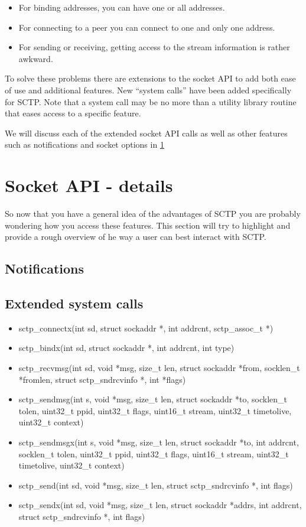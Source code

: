 \documentclass[conference]{IEEEtran}
\begin{document}
\begin{itemize}
 \item  For binding addresses, you can have one or all addresses.
 \item  For connecting to a peer you can connect to one and only one address.
 \item  For sending or receiving, getting access to the stream information is rather awkward.
\end{itemize}

To solve these problems there are extensions to the socket API to add
both ease of use and additional features. New ``system calls'' have been added
specifically for SCTP. Note that a system call may be no more than a utility library
routine that eases access to a specific feature. 

We will discuss each of the extended socket API calls as well as other features such
as notifications and socket options in \ref{adv}


\section{Socket API - details}
\label{adv}
So now that you have a general idea of the advantages of SCTP you are probably
wondering how you access these features. This section will try to highlight and provide
a rough overview of he way a user can best interact with SCTP.


\subsection{Notifications}

\subsection{Extended system calls}

\begin{itemize}
 \item  sctp\_connectx(int sd, struct sockaddr *, int addrcnt, sctp\_assoc\_t *)
 \item  sctp\_bindx(int sd, struct sockaddr *, int addrcnt, int type)
 \item  sctp\_recvmsg(int sd, void *msg, size\_t len, struct sockaddr *from, socklen\_t *fromlen, struct sctp\_sndrcvinfo *, int *flags)
 \item  sctp\_sendmsg(int s, void *msg, size\_t len, struct sockaddr *to, socklen\_t tolen, uint32\_t ppid, uint32\_t flags, uint16\_t stream, uint32\_t timetolive, uint32\_t context)
 \item  sctp\_sendmsgx(int s, void *msg, size\_t len, struct sockaddr *to, int addrcnt, socklen\_t tolen, uint32\_t ppid, uint32\_t flags, uint16\_t stream, uint32\_t timetolive, uint32\_t context)
 \item  sctp\_send(int sd, void *msg, size\_t len, struct sctp\_sndrcvinfo *, int flags)
 \item  sctp\_sendx(int sd, void *msg, size\_t len, struct sockaddr *addrs, int addrcnt, struct sctp\_sndrcvinfo *, int flags)
\end{itemize}
\end{document}
